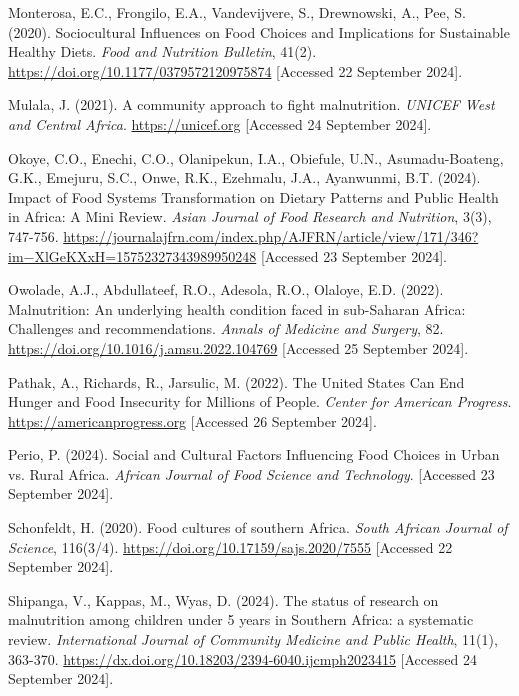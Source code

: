 \documentclass[a4paper,11pt]{report}
\begin{document}
\begin{thebibliography}
	Monterosa, E.C., Frongilo, E.A., Vandevijvere, S., Drewnowski, A., Pee, S. (2020). Sociocultural Influences on Food Choices and Implications for Sustainable Healthy Diets. \textit{Food and Nutrition Bulletin}, 41(2). \url{https://doi.org/10.1177/0379572120975874} [Accessed 22 September 2024].
	
	Mulala, J. (2021). A community approach to fight malnutrition. \textit{UNICEF West and Central Africa}. \url{https://unicef.org} [Accessed 24 September 2024].
	
	Okoye, C.O., Enechi, C.O., Olanipekun, I.A., Obiefule, U.N., Asumadu-Boateng, G.K., Emejuru, S.C., Onwe, R.K., Ezehmalu, J.A., Ayanwunmi, B.T. (2024). Impact of Food Systems Transformation on Dietary Patterns and Public Health in Africa: A Mini Review. \textit{Asian Journal of Food Research and Nutrition}, 3(3), 747-756. \url{https://journalajfrn.com/index.php/AJFRN/article/view/171/346?im−XlGeKXxH=15752327343989950248} [Accessed 23 September 2024].
	
	Owolade, A.J., Abdullateef, R.O., Adesola, R.O., Olaloye, E.D. (2022). Malnutrition: An underlying health condition faced in sub-Saharan Africa: Challenges and recommendations. \textit{Annals of Medicine and Surgery}, 82. \url{https://doi.org/10.1016/j.amsu.2022.104769} [Accessed 25 September 2024].
	
	Pathak, A., Richards, R., Jarsulic, M. (2022). The United States Can End Hunger and Food Insecurity for Millions of People. \textit{Center for American Progress}. \url{https://americanprogress.org} [Accessed 26 September 2024].
	
	Perio, P. (2024). Social and Cultural Factors Influencing Food Choices in Urban vs. Rural Africa. \textit{African Journal of Food Science and Technology}. [Accessed 23 September 2024].
	
	Schonfeldt, H. (2020). Food cultures of southern Africa. \textit{South African Journal of Science}, 116(3/4). \url{https://doi.org/10.17159/sajs.2020/7555} [Accessed 22 September 2024].
	
	Shipanga, V., Kappas, M., Wyas, D. (2024). The status of research on malnutrition among children under 5 years in Southern Africa: a systematic review. \textit{International Journal of Community Medicine and Public Health}, 11(1), 363-370. \url{https://dx.doi.org/10.18203/2394-6040.ijcmph2023415} [Accessed 24 September 2024].
	

\end{thebibliography}
\end{document}
